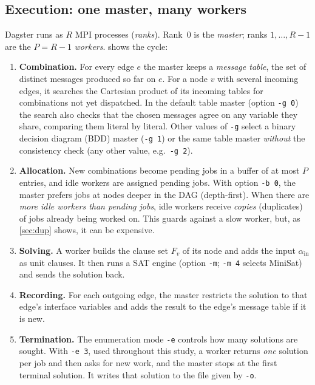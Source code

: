 \documentclass[11pt,a4paper]{article}
\newcommand{\opt}[1]{\texttt{#1}}
\begin{document}
\subsection{Execution: one master, many workers}
\label{sec:execution}
Dagster runs as $R$ MPI processes (\emph{ranks}). Rank~0 is the \emph{master}; ranks
$1,\dots,R-1$ are the $P=R-1$ \emph{workers}.  shows the cycle:
\begin{enumerate}
\item \textbf{Combination.} For every edge $e$ the master keeps a \emph{message table},
      the set of distinct messages produced so far on $e$. For a node $v$ with several
      incoming edges, it searches the Cartesian product of its incoming tables for
      combinations not yet dispatched. In the default table master (option \opt{-g 0})
      the search also checks that the chosen messages agree on any variable they share,
      comparing them literal by literal. Other values of \opt{-g} select a binary
      decision diagram (BDD) master (\opt{-g 1}) or the same table master \emph{without}
      the consistency check (any other value, e.g.\ \opt{-g 2}).
\item \textbf{Allocation.} New combinations become pending jobs in a buffer of at most $P$
      entries, and idle workers are assigned pending jobs. With option \opt{-b 0}, the
      master prefers jobs at nodes deeper in the DAG (depth-first). When there are
      \emph{more idle workers than pending jobs}, idle workers receive \emph{copies}
      (duplicates) of jobs already being worked on. This guards against a slow worker,
      but, as \cref{sec:dup} shows, it can be expensive.
\item \textbf{Solving.} A worker builds the clause set $F_v$ of its node and adds the input
      $\alpha_{\text{in}}$ as unit clauses. It then runs a SAT engine (option \opt{-m};
      \opt{-m 4} selects MiniSat) and sends the solution back.
\item \textbf{Recording.} For each outgoing edge, the master restricts the solution to that
      edge's interface variables and adds the result to the edge's message table if it is
      new.
\item \textbf{Termination.} The enumeration mode \opt{-e} controls how many solutions are
      sought. With \opt{-e 3}, used throughout this study, a worker returns \emph{one}
      solution per job and then asks for new work, and the master stops at the first
      terminal solution. It writes that solution to the file given by \opt{-o}.
\end{enumerate}
\end{document}
